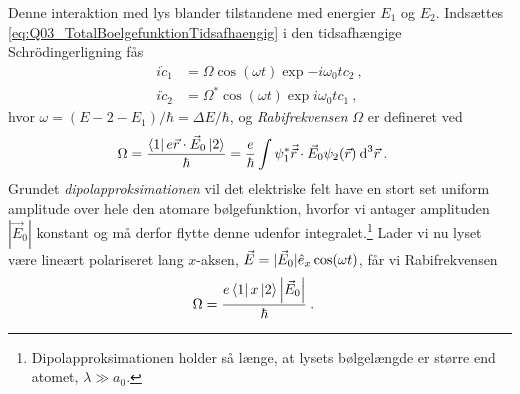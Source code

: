 Denne interaktion med lys blander tilstandene med energier $E_1$ og $E_2$. Indsættes \cref{eq:Q03_TotalBoelgefunktionTidsafhaengig} i den tidsafhængige Schrödingerligning fås
\begin{align}
    i\Dot{c}_1 &= \Omega \cos(\omega t) \exp{-i\omega_0 t} c_2 \: , \label{eq:Q03_CoupledDifferentialEquationsForC1AndC2_C1} \\
    i\Dot{c}_2 &= \Omega^* \cos(\omega t) \exp{i\omega_0 t} c_1 \: , \label{eq:Q03_CoupledDifferentialEquationsForC1AndC2_C2}
\end{align}
hvor $\omega = (E-2 - E_1)/\hbar = \Delta E / \hbar$, og \emph{Rabifrekvensen} $\Omega$ er defineret ved
\begin{align}
    \Omega &= \frac{\bra{1}e\Vec{r}\cdot\Vec{E}_0\ket{2}}{\hbar} = \frac{e}{\hbar} \int \psi_1^* \Vec{\Vec{r}} \cdot \Vec{E}_0 \psi_2(\Vec{r}) \: \text{d}^3\Vec{r} \: .
\end{align}
Grundet \emph{dipolapproksimationen} vil det elektriske felt have en stort set uniform amplitude over hele den atomare bølgefunktion, hvorfor vi antager amplituden $|\Vec{E}_0|$ konstant og må derfor flytte denne udenfor integralet.\footnote{Dipolapproksimationen holder så længe, at lysets bølgelængde er større end atomet, $\lambda \gg a_0$.} Lader vi nu lyset være lineært polariseret lang $x$-aksen, $\Vec{E} = |\Vec{E}_0|\Hat{e}_x\cos(\omega t)$, får vi Rabifrekvensen
\begin{align}
    \Omega &= \frac{e\bra{1}x\ket{2}\abs{\Vec{E}_0}}{\hbar} \: .
\end{align}


